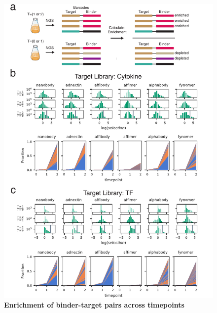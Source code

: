 \begin{figure}
\includegraphics[width=.9\textwidth]{figures/chapter3/20190621_fig6_enrichment_histograms.pdf}
\centering
\caption[Enrichment of binder-target pairs across timepoints]{\textbf{Enrichment of binder-target pairs across timepoints}
\label{chap3-selection-histograms}}
\end{figure}

